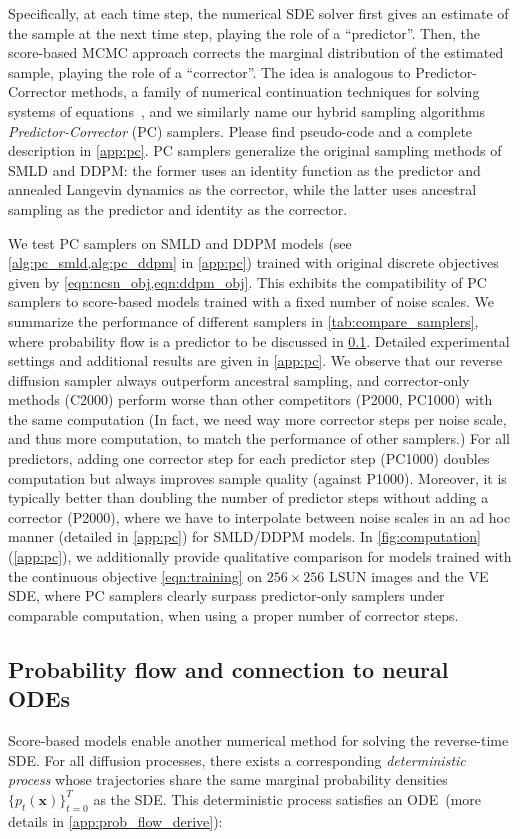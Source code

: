 Specifically, at each time step, the numerical SDE solver first gives an estimate of the sample at the next time step, playing the role of a ``predictor''. Then, the score-based MCMC approach corrects the marginal distribution of the estimated sample, playing the role of a ``corrector''. The idea is analogous to Predictor-Corrector methods, a family of numerical continuation techniques for solving systems of equations~\citep{allgower2012numerical}, and we similarly name our hybrid sampling algorithms \emph{Predictor-Corrector} (PC) samplers. Please find pseudo-code and a complete description in \ref{app:pc}. PC samplers generalize the original sampling methods of SMLD and DDPM: the former uses an identity function as the predictor and annealed Langevin dynamics as the corrector, while the latter uses ancestral sampling as the predictor and identity as the corrector. 

We test PC samplers on SMLD and DDPM models (see \ref{alg:pc_smld,alg:pc_ddpm} in \ref{app:pc}) trained with original discrete objectives given by \ref{eqn:ncsn_obj,eqn:ddpm_obj}. 
This exhibits the compatibility of PC samplers to score-based models trained with a fixed number of noise scales. We summarize the performance of different samplers in \ref{tab:compare_samplers}, where probability flow is a predictor to be discussed in \ref{sec:flow}. Detailed experimental settings and additional results are given in \ref{app:pc}. We observe that our reverse diffusion sampler always outperform ancestral sampling, and corrector-only methods (C2000) perform worse than other competitors (P2000, PC1000) with the same computation (In fact, we need way more corrector steps per noise scale, and thus more computation, to match the performance of other samplers.) For all predictors, adding one corrector step for each predictor step (PC1000) doubles computation but always improves sample quality (against P1000). Moreover, it is typically better than doubling the number of predictor steps without adding a corrector (P2000), where we have to interpolate between noise scales in an ad hoc manner (detailed in \ref{app:pc}) for SMLD/DDPM models. In \ref{fig:computation} (\ref{app:pc}), we additionally provide qualitative comparison for models trained with the continuous objective \ref{eqn:training} on $256\times 256$ LSUN images and the VE SDE, where PC samplers clearly surpass predictor-only samplers under comparable computation, when using a proper number of corrector steps.

\subsection{Probability flow and connection to neural ODEs}\label{sec:flow}
Score-based models enable another numerical method for solving the reverse-time SDE. For all diffusion processes, there exists a corresponding \emph{deterministic process} whose trajectories share the same marginal probability densities $\{p_t(\mathbf{x})\}_{t=0}^T$ as the SDE. This deterministic process satisfies an ODE~(more details in \ref{app:prob_flow_derive}):

